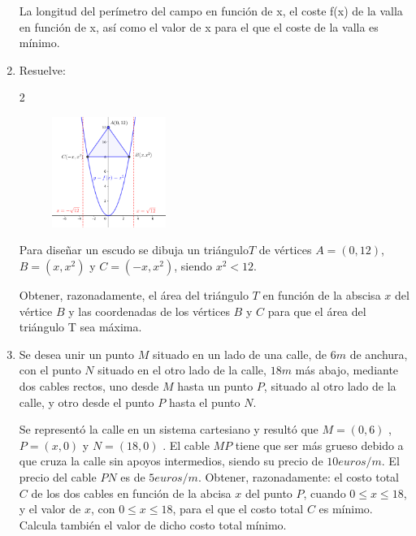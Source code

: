 \begin{enumerate}
La longitud del perímetro del campo en función de x,  el 
coste f(x) de la valla en función de x, así como  el valor de 
x para el que el coste de la valla es mínimo. 

 \rightline{\textcolor{gris}{el coste es mínimo para $x \approx 65.15m$}}

\clearpage

\item Resuelve:

\begin {multicols} {2}
	\begin{figure}[H]
		\centering
		\includegraphics[width=0.35\textwidth]{imagenes/imagenes05/T05IM47.png}
	\end{figure}
	
	Para diseñar un escudo se dibuja un triángulo$T$ de vértices $A = (0, 12)$, $B=(x,x^2)$ y $C=(-x,x^2)$, siendo $x^2 <12$.
	
	Obtener, razonadamente, el área del triángulo $T$ en función de la abscisa $x$ del vértice $B$ y las coordenadas de los vértices $B$ y $C$ para que el área del triángulo T sea máxima.
\end {multicols}


\rightline{\textcolor{gris}{Solución: $A(x)=12x-x^3; \quad $}}
\rightline{\textcolor{gris}{Área máxima para $x=2 \to B(2,4); ; C(.2,4)$}}

\item Se desea unir un punto $M$ situado en un lado de una calle, de $6 m$ de anchura, con el punto $N$ situado en el otro lado de la calle, $18 m$ más abajo, mediante dos cables rectos, uno desde $M$ hasta un punto $P$, situado al otro lado de la calle, y otro desde el punto $P$ hasta el punto $N$. 

Se representó la calle en un sistema cartesiano y resultó que $M 
= (0, 6)$ , $P = (x, 0)$ y $N = (18, 0)$ . El cable $MP$ tiene que ser más grueso debido a que cruza la calle sin apoyos 
intermedios, siendo su precio de $10 euros/m$. El precio del 
cable $PN$ es de $5 euros/m$. Obtener, razonadamente: el 
costo total $C$ de los dos cables en función de la abcisa $x$ del punto $P$, cuando $0 \le x \le 18$, y el valor de $x$, con $0\le x\le 18$, para el que el costo total $C$ es mínimo. Calcula también  el valor de dicho costo total mínimo. 


\end{enumerate}
